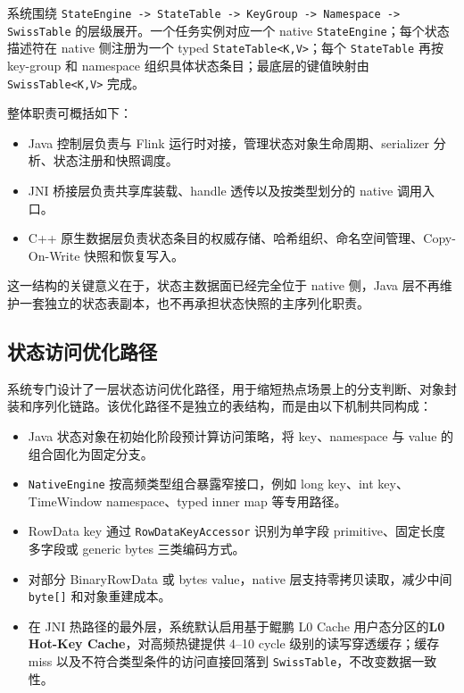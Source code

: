 \documentclass[a4paper,11pt]{article}
\begin{document}
系统围绕 \texttt{StateEngine -> StateTable -> KeyGroup -> Namespace -> SwissTable} 的层级展开。一个任务实例对应一个 native \texttt{StateEngine}；每个状态描述符在 native 侧注册为一个 typed \texttt{StateTable<K,V>}；每个 \texttt{StateTable} 再按 key-group 和 namespace 组织具体状态条目；最底层的键值映射由 \texttt{SwissTable<K,V>} 完成。

整体职责可概括如下：

\begin{itemize}
  \item Java 控制层负责与 Flink 运行时对接，管理状态对象生命周期、serializer 分析、状态注册和快照调度。
  \item JNI 桥接层负责共享库装载、handle 透传以及按类型划分的 native 调用入口。
  \item C++ 原生数据层负责状态条目的权威存储、哈希组织、命名空间管理、Copy-On-Write 快照和恢复写入。
\end{itemize}

这一结构的关键意义在于，状态主数据面已经完全位于 native 侧，Java 层不再维护一套独立的状态表副本，也不再承担状态快照的主序列化职责。

\subsection{状态访问优化路径}

系统专门设计了一层状态访问优化路径，用于缩短热点场景上的分支判断、对象封装和序列化链路。该优化路径不是独立的表结构，而是由以下机制共同构成：

\begin{itemize}
  \item Java 状态对象在初始化阶段预计算访问策略，将 key、namespace 与 value 的组合固化为固定分支。
  \item \texttt{NativeEngine} 按高频类型组合暴露窄接口，例如 long key、int key、TimeWindow namespace、typed inner map 等专用路径。
  \item RowData key 通过 \texttt{RowDataKeyAccessor} 识别为单字段 primitive、固定长度多字段或 generic bytes 三类编码方式。
  \item 对部分 BinaryRowData 或 bytes value，native 层支持零拷贝读取，减少中间 \texttt{byte[]} 和对象重建成本。
  \item 在 JNI 热路径的最外层，系统默认启用基于鲲鹏 L0 Cache 用户态分区的\textbf{L0 Hot-Key Cache}，对高频热键提供 4--10 cycle 级别的读写穿透缓存；缓存 miss 以及不符合类型条件的访问直接回落到 \texttt{SwissTable}，不改变数据一致性。
\end{itemize}
\end{document}
